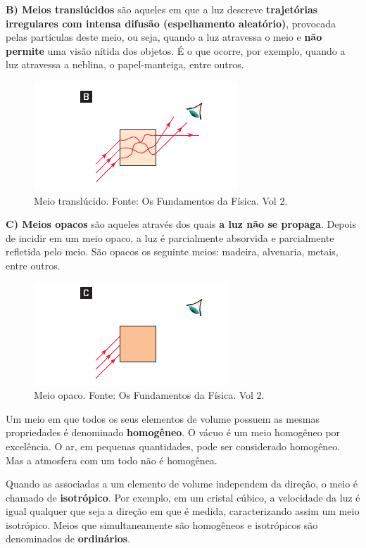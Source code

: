 \documentclass[11pt,twocolumn,oneside]{article}
\begin{document}
\textbf{B) Meios translúcidos} são aqueles em que a luz descreve \textbf{trajetórias irregulares com intensa difusão (espelhamento aleatório)}, provocada pelas partículas deste meio, ou seja, quando a luz atravessa o meio e \textbf{não permite} uma visão nítida dos objetos. É o que ocorre, por exemplo, quando a luz atravessa a neblina, o papel-manteiga, entre outros.


\begin{figure}[h]{}
\centering\includegraphics[width=2.5truein]{img5.png}
\caption{Meio translúcido. Fonte: Os Fundamentos da Física. Vol 2.}
\centering
\end{figure}

\textbf{C) Meios opacos} são aqueles através dos quais \textbf{a luz não se propaga}. Depois de incidir em um meio opaco, a luz é parcialmente absorvida e parcialmente refletida pelo meio. São opacos os seguinte meios: madeira, alvenaria, metais, entre outros.


\begin{figure}[h]{}
\centering\includegraphics[width=2.5truein]{img6.png}
\caption{Meio opaco. Fonte: Os Fundamentos da Física. Vol 2.}
\centering
\end{figure}

Um meio em que todos os seus elementos de volume possuem as mesmas propriedades é denominado \textbf{homogêneo}. O vácuo é um meio homogêneo por excelência. O ar, em pequenas quantidades, pode ser considerado homogêneo. Mas a atmosfera com um todo não é homogênea.


Quando as associadas a um elemento de volume independem da direção, o meio é chamado de \textbf{isotrópico}. Por exemplo, em um cristal cúbico, a velocidade da luz é igual qualquer que seja a direção em que é medida, caracterizando assim um meio isotrópico. Meios que simultaneamente são homogêneos e isotrópicos são denominados de \textbf{ordinários}.
\end{document}
